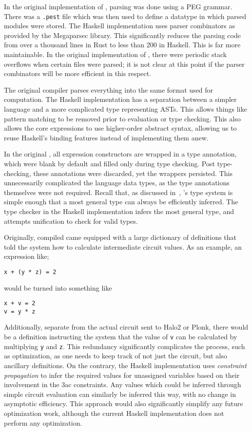 \documentclass[
    9pt,            
    techreport,       
    affiltop,       
]{art}
\begin{document}
In the original implementation of \VampIR{}, parsing was done using a PEG grammar. There was a \texttt{.pest} file which was then used to define a datatype in which parsed modules were stored. The Haskell implementation uses parser combinators as provided by the Megaparsec library. This significantly reduces the parsing code from over a thousand lines in Rust to less than 200 in Haskell. This is far more maintainable. In the original implementation of \VampIR{}, there were periodic stack overflows when certain files were parsed; it is not clear at this point if the parser combinators will be more efficient in this respect.

The original \VampIR{} compiler parses everything into the same format used for computation. The Haskell implementation has a separation between a simpler  language and a more complicated type representing \VampIR{} ASTs. This allows things like pattern matching to be removed prior to evaluation or type checking. This also allows the core expressions to use higher-order abstract syntax, allowing us to reuse Haskell's binding features instead of implementing them anew.

In the original \VampIR{}, all expression constructors are wrapped in a type annotation, which were blank by default and filled only during type checking. Post type-checking, these annotations were discarded, yet the wrappers persisted. This unnecessarily complicated the language data types, as the type annotations themselves were not required. Recall that,
as discussed in~, 
\VampIR{}'s type system is simple enough that a most general type can always be efficiently inferred. The type checker in the Haskell implementation infers the most general type, and attempts unification to check for valid types.

Originally, compiled \VampIR{} came equipped with a large dictionary of definitions that told the system how to calculate intermediate circuit values. As an example, an expression like;

\begin{verbatim}
x + (y * z) = 2
\end{verbatim}
would be turned into something like
\begin{verbatim}
x + v = 2
v = y * z
\end{verbatim}

Additionally, separate from the actual circuit sent to Halo2 or Plonk, there would be a definition instructing the system that the
value of \texttt{v} can be calculated by multiplying \texttt{y} and \texttt{z}. This redundancy significantly complicates the process, such as optimization, as one needs to keep track of not just the circuit, but also ancillary definitions. On the contrary, the Haskell implementation uses \emph{constraint propagation} to infer the required values for unassigned variables based on their involvement in the \textsf{3ac} constraints. Any values which could be inferred through simple circuit evaluation can similarly be inferred this way, with no change in asymptotic efficiency. This approach would also significantly simplify any future optimization work, although the current Haskell implementation does not perform any optimization.
\end{document}
